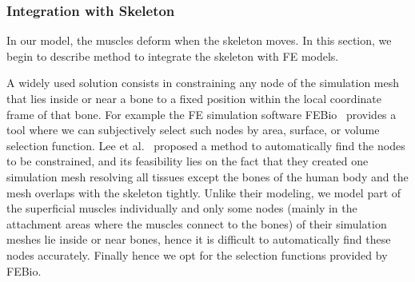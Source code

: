 \subsubsection{\textbf{Integration with Skeleton}}
\label{sec:integration}
In our model, the muscles deform when the skeleton moves. In this section, we begin to describe method to integrate the skeleton with FE models.

A widely used solution consists in constraining any node of the simulation mesh that lies inside or near a bone to a fixed position within the local coordinate frame of that bone. For example the FE
simulation software FEBio~\cite{Maas:2012:febio} provides a tool where we can subjectively select such nodes by area, surface, or volume selection function. Lee et al.~\cite{Lee:2009:CBM} proposed a method to automatically find the nodes to be constrained, and its feasibility lies on the fact that they created one simulation mesh resolving all
tissues except the bones of the human body and the mesh overlaps with the skeleton tightly. Unlike their modeling, we model part of the superficial muscles individually and only some nodes (mainly in the attachment areas where the muscles connect to the bones) of their simulation meshes lie inside or near bones, hence it is difficult to
automatically find these nodes accurately. Finally hence we opt for the selection functions provided by FEBio.

